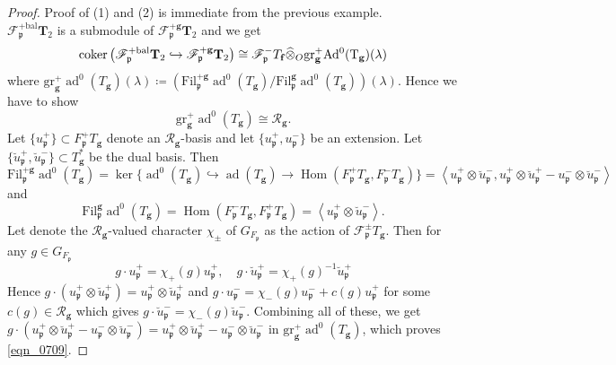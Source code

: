 \documentclass[10pt]{amsart}
\numberwithin{equation}{section}
\theoremstyle{definition}
\theoremstyle{remark} %
\newtheorem{rmk}[thm]{Remark}
\newcommand{\ad}{\operatorname{ad}}
\newcommand{\Hom}{\operatorname{Hom}}
\newcommand{\f}{\mathbf{f}}
\newcommand{\scrF}{\mathscr{F}}
\newcommand{\g}{\mathbf{g}}
\newcommand{\p}{\mathfrak{p}}
\newcommand{\R}{\mathcal{R}}
\newcommand{\T}{\mathbf{T}}
\begin{document}
	\begin{proof}
		Proof of (1) and (2) is immediate from the previous example.\\
		$  \scrF^{+\mathrm{bal}}_{\p}\T_{2} $ is a submodule of $ \scrF^{+\g}_{\p}\T_{2} $ and we get 
		$$ \operatorname{coker}\left( \scrF^{+\mathrm{bal}}_{\p}\T_{2} \hookrightarrow \scrF^{+\g}_{\p}\T_{2} \right) \cong \scrF^-_{\p}T_{\f} \widehat{\otimes}_O \rm gr_{\g}^+ \rm Ad^0 (T_{\g})(\lambda) $$
		where $ \mathrm{gr}_{\g}^+ \ad^0 (T_{\g})(\lambda) \coloneqq \left(\mathrm{Fil}^{+\g}_{\p} \ad^0(T_\g) /\mathrm{Fil}^{\g}_{\p}\ad^0(T_\g)\right)(\lambda) $. Hence we have to show 
		\begin{equation}
			\label{eqn_0709}
			\mathrm{gr}_{\g}^+  \ad^0 (T_{\g}) \cong  \R_{\g}  .
		\end{equation}
		Let $ \{ u^+_\p \} \subset F_{\p}^+T_\g $ denote an $ \R_\g $-basis and let $ \{u^+_\p,u^-_\p \} $ be an extension. Let $ \{\breve{u}^+_\p,\breve{u}^-_\p \} \subset T_\g^* $ be the dual basis. Then 
		\begin{equation}
			\mathrm{Fil}^{+\g}_{\p} \ad^0(T_\g) = \ker\{\ad^0(T_\g) \hookrightarrow \ad(T_\g) \rightarrow \Hom(F_{\p}^+ T_\g,F_{\p}^- T_\g) \} = \left\langle u^+_\p \otimes \breve{u}^-_\p, u^+_\p \otimes \breve{u}^+_\p - u^-_\p \otimes \breve{u}^-_\p  \right\rangle 
		\end{equation}
		and 
		$$ \mathrm{Fil}^{\g}_{\p}\ad^0(T_\g) = \Hom(F_{\p}^- T_\g,F_{\p}^+  T_\g) =\left\langle u^+_\p \otimes \breve{u}^-_\p \right\rangle.  $$
		Let denote the $ \R_\g $-valued character $ \chi_\pm $ of $ G_{F_\p} $ as the action of $ \scrF^\pm_\p T_\g$. Then for any $ g \in G_{F_\p} $
		$$ g \cdot u^+_\p = \chi_+(g)u^+_\p, \quad g \cdot \breve{u}^+_\p = \chi_+(g)^{-1}\breve{u}^+_\p $$
		Hence $ g \cdot (u^+_\p \otimes \breve{u}^+_\p) = u^+_\p \otimes \breve{u}^+_\p $
		and $ g \cdot u^-_\p = \chi_-(g)u^-_\p + c(g)u^+_\p  $ for some $ c(g) \in \R_{\g} $ which gives $ g \cdot \breve{u}^-_\p = \chi_-(g)\breve{u}^-_\p $.
		Combining all of these, we get $ g \cdot ( u^+_\p \otimes \breve{u}^+_\p - u^-_\p \otimes \breve{u}^-_\p) =  u^+_\p \otimes \breve{u}^+_\p - u^-_\p \otimes \breve{u}^-_\p $ in $  \mathrm{gr}_{\g}^+  \ad^0 (T_{\g}) $, which proves \eqref{eqn_0709}.
	\end{proof}
\end{document}
